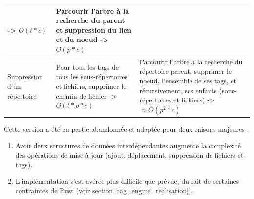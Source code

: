 \documentclass[a4paper, 12pt]{article}
\begin{document}
\begin{center}
\begin{tabularx}{16cm}{|p{3cm}|p{5cm}|X|}
            -> $O(t * c)$ & Parcourir l'arbre à la recherche du parent et suppression du lien et 
            du noeud -> $O(p * c)$ \\ \hline
        Suppression d'un répertoire & Pour tous les tags de tous les sous-répertoires et fichiers, 
            supprimer le chemin de fichier -> $O(t * p * c)$ & Parcourir l'arbre à la recherche du 
            répertoire parent, supprimer le noeud, l'ensemble de ses tags, et récursivement, ses 
            enfants (sous-répertoires et fichiers) -> $\approx O(p^2 * c)$ \\ \hline
    \end{tabularx}
    \label{tableau_architecture_1}
\end{center}

Cette version a été en partie abandonnée et adaptée pour deux raisons majeures :
\begin{enumerate}
    \item Avoir deux structures de données interdépendantes augmente la complexité des 
        opérations de mise à jour (ajout, déplacement, suppression de fichiers et tags).
    \item L'implémentation s'est avérée plus difficile que prévue, du fait de certaines 
        contraintes de Rust (voir section \ref{tag_engine_realisation}).
\end{enumerate}
\end{document}

